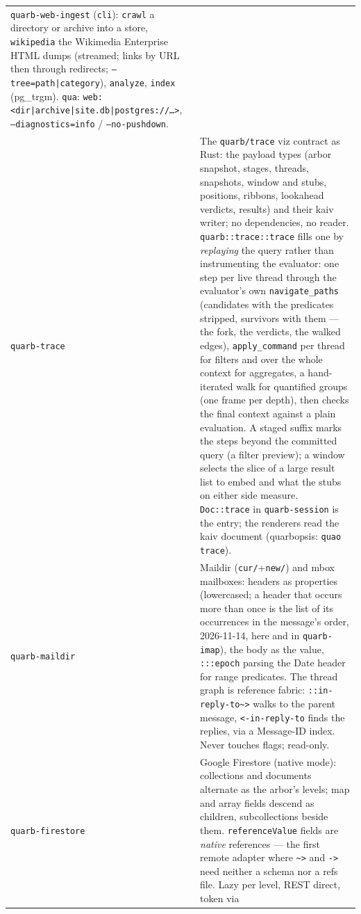 \documentclass{report}
\begin{document}
\begin{xltabular}{\textwidth}{l X}
  \texttt{quarb-web-ingest} (\texttt{cli}): \texttt{crawl} a
  directory or archive into a store, \texttt{wikipedia} the
  Wikimedia Enterprise HTML dumps (streamed; links by URL then
  through redirects; \texttt{--tree=path|category}),
  \texttt{analyze}, \texttt{index} (pg\_trgm). \texttt{qua}:
  \texttt{web:<dir|archive|site.db|postgres://…>},
  \texttt{--diagnostics=info} / \texttt{--no-pushdown}. \\
\texttt{quarb-trace} & The \texttt{quarb/trace} viz contract as
  Rust: the payload types (arbor snapshot, stages, threads,
  snapshots, window and stubs, positions, ribbons, lookahead
  verdicts, results) and their kaiv writer; no dependencies, no
  reader. \texttt{quarb::trace::trace} fills one by
  \emph{replaying} the query rather than instrumenting the
  evaluator: one step per live thread through the evaluator's own
  \texttt{navigate\_paths} (candidates with the predicates
  stripped, survivors with them --- the fork, the verdicts, the
  walked edges), \texttt{apply\_command} per thread for filters and
  over the whole context for aggregates, a hand-iterated walk for
  quantified groups (one frame per depth), then checks the final
  context against a plain evaluation. A staged suffix marks the
  steps beyond the committed query (a filter preview); a window
  selects the slice of a large result list to embed and what the
  stubs on either side measure. \texttt{Doc::trace} in
  \texttt{quarb-session} is the entry; the renderers read the
  kaiv document (quarbopsis: \texttt{quao trace}). \\
\texttt{quarb-maildir} & Maildir (\texttt{cur/}+\texttt{new/})
  and mbox mailboxes: headers as properties (lowercased; a header
  that occurs more than once is the list of its occurrences in the
  message's order, 2026-11-14, here and in \texttt{quarb-imap}), the
  body as the value, \texttt{:::epoch} parsing the Date header
  for range predicates. The thread graph is reference fabric:
  \texttt{::in-reply-to\textasciitilde>} walks to the parent
  message, \texttt{<-in-reply-to} finds the replies, via a
  Message-ID index. Never touches flags; read-only. \\
\texttt{quarb-firestore} & Google Firestore (native mode):
  collections and documents alternate as the arbor's levels; map
  and array fields descend as children, subcollections beside
  them. \texttt{referenceValue} fields are \emph{native}
  references — the first remote adapter where
  \texttt{\textasciitilde>} and \texttt{->} need neither a
  schema nor a refs file. Lazy per level, REST direct, token via

\end{xltabular}
\end{document}
